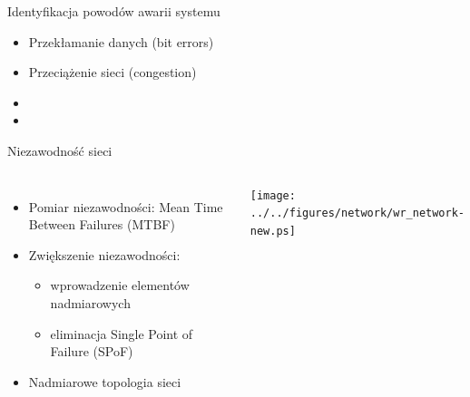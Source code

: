 \documentclass[compress,red]{beamer}
\begin{document}
\begin{frame}{Identyfikacja powodów awarii systemu}


  \begin{itemize}
    \item Przekłamanie danych (bit errors)
    \item Przeciążenie sieci (congestion)
    \item {}
    \item \color{black}{Zbyt długi czas transmisji (exceeding upper bound latency)}
  \end{itemize}

\end{frame}
\begin{frame}{Niezawodność sieci}


  \begin{columns}[c]

  \begin{itemize}
    \item Pomiar niezawodności: Mean Time Between Failures (MTBF)
    \item Zwiększenie niezawodności:
    \begin{itemize}
      \item wprowadzenie elementów nadmiarowych
      \item eliminacja Single Point of Failure (SPoF)
    \end{itemize}
    \item Nadmiarowe topologia sieci
  \end{itemize}

      \vspace{2cm}


      \begin{center}
      \texttt{[image: ../../figures/network/wr\_network-new.ps]}
      \end{center}

      \vspace{2cm}

  \end{columns}

\end{frame}
\end{document}
